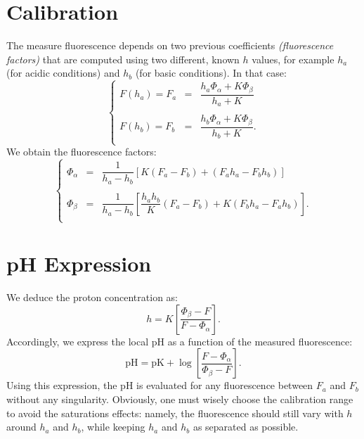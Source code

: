 \documentclass[aps,11pt]{revtex4}
\begin{document}
\section{Calibration}
The measure fluorescence depends on two previous coefficients \textit{(fluorescence factors)} that are computed using two different, known $h$ values, for example $h_a$ (for acidic conditions) and $h_b$ (for basic conditions).
In that case:
\begin{equation}
\left\lbrace
	\begin{array}{rcl}
	F(h_a) = F_a & = & \dfrac{h_a\Phi_\alpha + K\Phi_\beta}{h_a+K}\\
	\\
	F(h_b) = F_b & = & \dfrac{h_b\Phi_\alpha + K\Phi_\beta}{h_b+K}.\\
	\end{array}
\right.
\end{equation}
We obtain the fluorescence factors:
\begin{equation}
\left\lbrace
\begin{array}{rcl}
	\Phi_\alpha & = & \dfrac{1}{h_a-h_b}\left[ K(F_a-F_b) + (F_ah_a-F_bh_b)\right]\\
	\\
	\Phi_\beta & = & \dfrac{1}{h_a-h_b}\left[ \dfrac{h_ah_b}{K} (F_a-F_b) + K(F_bh_a-F_ah_b)\right].\\
\end{array}
\right.
\end{equation}

\section{pH Expression}
We deduce the proton concentration as:
\begin{equation}
h=K\left[\dfrac{\Phi_\beta-F}{F-\Phi_\alpha}\right].
\end{equation}
Accordingly, we express the local pH as a function of the measured fluorescence:
\begin{equation}
	\mathrm{pH} = \mathrm{pK} + \log  \left[ \dfrac{F-\Phi_\alpha}{\Phi_\beta-F}\right].
\end{equation}
Using this expression, the pH is evaluated for any fluorescence between $F_a$ and $F_b$ without any singularity.
Obviously, one must wisely choose
the calibration range to avoid the saturations effects: namely, the fluorescence should still vary with $h$ around $h_a$ and $h_b$, while keeping $h_a$ and $h_b$ as separated as possible.
\end{document}
